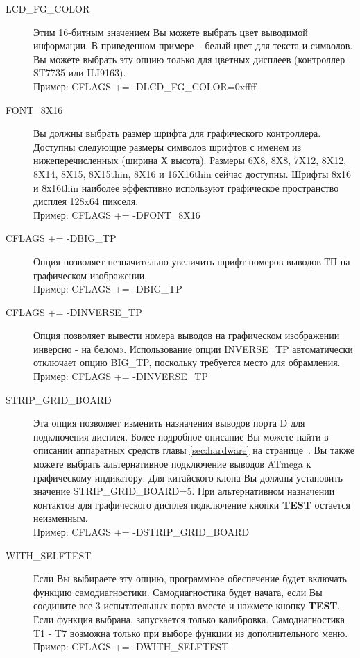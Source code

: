 \begin{description}
  \item[LCD\_FG\_COLOR] Этим 16-битным значением Вы можете выбрать цвет выводимой информации.
В приведенном примере -- белый цвет для текста и символов.
Вы можете выбрать эту опцию только для цветных дисплеев (контроллер ST7735 или ILI9163).\\
Пример: CFLAGS += -DLCD\_FG\_COLOR=0xffff

  \item[FONT\_8X16] Вы должны выбрать размер шрифта для графического контроллера.
  Доступны следующие размеры символов шрифтов с именем  из нижеперечисленных (ширина Х высота).
Размеры 6X8, 8X8, 7X12, 8X12, 8X14, 8X15, 8X15thin, 8X16 и 16X16thin сейчас доступны.
Шрифты 8х16 и 8х16thin наиболее эффективно используют графическое пространство дисплея 128x64 пикселя.\\
Пример: CFLAGS += -DFONT\_8X16

  \item[CFLAGS += -DBIG\_TP] Опция позволяет незначительно увеличить шрифт номеров выводов ТП на графическом 
изображении.\\
Пример: CFLAGS += -DBIG\_TP

  \item[CFLAGS += -DINVERSE\_TP] Опция позволяет вывести номера выводов на графическом изображении инверсно -  
на белом». Использование опции INVERSE\_TP автоматически отключает опцию BIG\_TP, поскольку требуется место 
для обрамления.\\
Пример: CFLAGS += -DINVERSE\_TP
  
  \item[STRIP\_GRID\_BOARD] Эта опция позволяет изменить назначения выводов порта D для подключения дисплея.
Более подробное описание Вы можете найти в описании аппаратных средств главы \ref{sec:hardware} на 
странице~\pageref{sec:hardware}.
Вы также можете выбрать альтернативное подключение выводов ATmega к графическому индикатору.
Для китайского клона  Вы должны установить значение STRIP\_GRID\_BOARD=5.
При альтернативном назначении контактов для графического дисплея подключение кнопки \textbf{ TEST} остается неизменным.\\
Пример: CFLAGS += -DSTRIP\_GRID\_BOARD

  \item[WITH\_SELFTEST] Если Вы выбираете эту опцию, программное обеспечение будет включать функцию самодиагностики. 
  Самодиагностика будет начата, если Вы соедините все 3 испытательных порта вместе  и нажмете кнопку 
\textbf{ TEST}. Если функция выбрана, запускается только калибровка. Самодиагностика T1 - T7 возможна только при выборе 
функции из дополнительного меню.\\
Пример: CFLAGS += -DWITH\_SELFTEST


\end{description}
